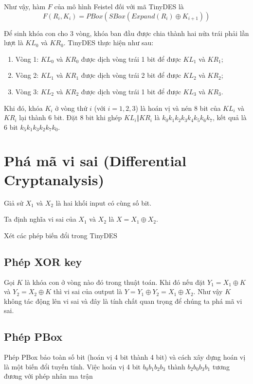 \documentclass{article}
\begin{document}
Như vậy, hàm $F$ của mô hình Feistel đối với mã TinyDES là
\[F(R_i, K_i) = PBox(SBox(Expand(R_i) \oplus K_{i+1}))\]

Để sinh khóa con cho 3 vòng, khóa ban đầu được chia
thành hai nửa trái phải lần lượt là $KL_0$ và $KR_0$. 
TinyDES thực hiện như sau:

\begin{enumerate}
    \item Vòng 1: $KL_0$ và $KR_0$ được dịch vòng trái 1 bit để được $KL_1$ và $KR_1$;
    \item Vòng 2: $KL_1$ và $KR_1$ được dịch vòng trái 2 bit để được $KL_2$ và $KR_2$;
    \item Vòng 3: $KL_2$ và $KR_2$ được dịch vòng trái 1 bit để được $KL_3$ và $KR_3$.
\end{enumerate}

Khi đó, khóa $K_i$ ở vòng thứ $i$ (với $i = 1, 2, 3$) là hoán vị và nén 8 bit
của $KL_i$ và $KR_i$ lại thành 6 bit. Đặt 8 bit khi ghép $KL_i \Vert KR_i$ là 
$k_0 k_1 k_2 k_3 k_4 k_5 k_6 k_7$, kết quả là 6 bit $k_5 k_1 k_3 k_2 k_7 k_0$.

\section{Phá mã vi sai (Differential Cryptanalysis)}

Giả sử $X_1$ và $X_2$ là hai khối input có cùng số bit.

Ta định nghĩa vi sai của $X_1$ và $X_2$ là $X = X_1 \oplus X_2$.

Xét các phép biến đổi trong TinyDES

\subsection{Phép XOR key}

Gọi $K$ là khóa con ở vòng nào đó trong thuật toán. Khi đó nếu đặt 
$Y_1 = X_1 \oplus K$ và $Y_2 = X_2 \oplus K$ thì vi sai của output là
$Y = Y_1 \oplus Y_2 = X_1 \oplus X_2$. Như vậy $K$ không tác động lên vi
sai và đây là tính chất quan trọng để chúng ta phá mã vi sai.

\subsection{Phép PBox}

Phép PBox bảo toàn số bit (hoán vị 4 bit thành 4 bit) và cách xây dựng hoán vị là
một biến đổi tuyến tính. Việc hoán vị 4 bit $b_0 b_1 b_2 b_3$ thành $b_2 b_0 b_3 b_1$
tương đương với phép nhân ma trận
\end{document}
